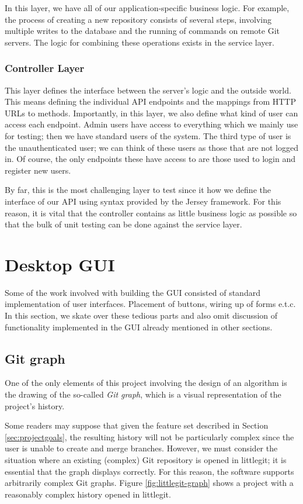 In this layer, we have all of our application-specific business logic. For example, the process of creating a new repository consists of several steps, involving multiple writes to the database and the running of commands on remote Git servers. The logic for combining these operations exists in the service layer.

\subsubsection{Controller Layer}

This layer defines the interface between the server's logic and the outside world. This means defining the individual API endpoints and the mappings from HTTP URLs to methods. Importantly, in this layer, we also define what kind of user can access each endpoint. Admin users have access to everything which we mainly use for testing; then we have standard users of the system. The third type of user is the unauthenticated user; we can think of these users as those that are not logged in. Of course, the only endpoints these have access to are those used to login and register new users.

By far, this is the most challenging layer to test since it how we define the interface of our API using syntax provided by the Jersey framework. For this reason, it is vital that the controller contains as little business logic as possible so that the bulk of unit testing can be done against the service layer.

\section{Desktop GUI}

Some of the work involved with building the GUI consisted of standard implementation of user interfaces. Placement of buttons, wiring up of forms e.t.c. In this section, we skate over these tedious parts and also omit discussion of functionality implemented in the GUI already mentioned in other sections.

\subsection{Git graph}

One of the only elements of this project involving the design of an algorithm is the drawing of the so-called \emph{Git graph}, which is a visual representation of the project's history.

Some readers may suppose that given the feature set described in Section \ref{sec:projectgoals}, the resulting history will not be particularly complex since the user is unable to create and merge branches. However, we must consider the situation where an existing (complex) Git repository is opened in littlegit; it is essential that the graph displays correctly. For this reason, the software supports arbitrarily complex Git graphs. Figure \ref{fig:littlegit-graph} shows a project with a reasonably complex history opened in littlegit.

